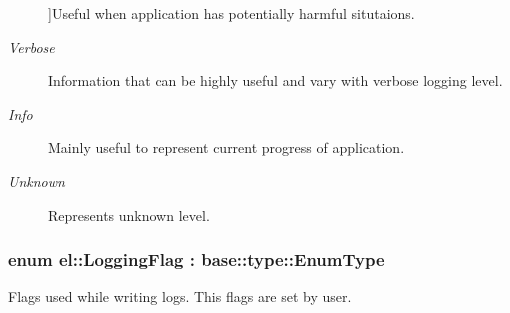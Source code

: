 \begin{Desc}
\begin{description}
{}]Useful when application has potentially harmful situtaions. \item[{\em 
\hypertarget{namespaceel_ab0ac6091262344c52dd2d3ad099e8e36ad4a9fa383ab700c5bdd6f31cf7df0faf}{Verbose}\label{namespaceel_ab0ac6091262344c52dd2d3ad099e8e36ad4a9fa383ab700c5bdd6f31cf7df0faf}
}]Information that can be highly useful and vary with verbose logging level. \item[{\em 
\hypertarget{namespaceel_ab0ac6091262344c52dd2d3ad099e8e36a4059b0251f66a18cb56f544728796875}{Info}\label{namespaceel_ab0ac6091262344c52dd2d3ad099e8e36a4059b0251f66a18cb56f544728796875}
}]Mainly useful to represent current progress of application. \item[{\em 
\hypertarget{namespaceel_ab0ac6091262344c52dd2d3ad099e8e36a88183b946cc5f0e8c96b2e66e1c74a7e}{Unknown}\label{namespaceel_ab0ac6091262344c52dd2d3ad099e8e36a88183b946cc5f0e8c96b2e66e1c74a7e}
}]Represents unknown level. \end{description}
\end{Desc}
\hypertarget{namespaceel_a2784aacd04cb7816ac1c0b20fcbf83cb}{
\subsubsection[{Logging\-Flag}]{\setlength{\rightskip}{0pt plus 5cm}enum {\bf el\-::\-Logging\-Flag} \-: base\-::type\-::\-Enum\-Type\hspace{0.3cm}{\ttfamily [strong]}}}\label{namespaceel_a2784aacd04cb7816ac1c0b20fcbf83cb}


Flags used while writing logs. This flags are set by user. 

